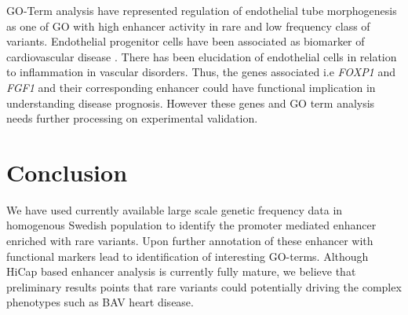 \documentclass[10pt]{article} %
\begin{document}
GO-Term analysis have represented regulation of endothelial tube morphogenesis as one of GO with high enhancer activity in rare and low frequency class of variants. Endothelial progenitor cells have been associated as biomarker of cardiovascular disease \cite{grisar2011endothelial}.  There has been elucidation of endothelial cells in relation to inflammation in vascular disorders. Thus, the genes associated i.e \textit{FOXP1 }and  \textit{FGF1} and their corresponding enhancer could have functional implication in understanding disease prognosis. However these genes and GO term analysis needs further processing on experimental validation.


\section{Conclusion}

We have used currently available large scale genetic frequency data in homogenous Swedish population to identify the promoter mediated enhancer enriched with rare variants. Upon further annotation of these enhancer with functional markers lead to identification of interesting GO-terms. Although HiCap based enhancer analysis is currently fully mature, we believe that preliminary results points that rare variants could potentially driving the complex phenotypes such as BAV heart disease.



\newpage


%

\end{document}
